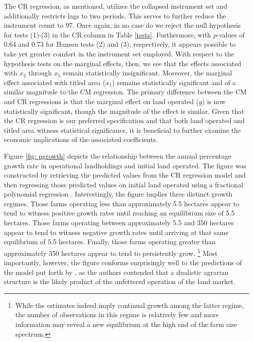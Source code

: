 \documentclass[english]{article}
\begin{document}
The CR regression, as mentioned, utilizes the collapsed instrument set and 
additionally restricts lags to two periods.
This serves to further reduce the instrument count to 97.
Once again, in no case do we reject the null hypothesis for tests (1)-(3) in the 
CR column in Table \ref{tests}. 
Furthermore, with $p$-values of 0.64 and 0.73 for Hansen tests (2) and (3), 
respectively, it appears possible to take yet greater comfort in the instrument 
set employed.
With respect to the hypothesis tests on the marginal effects, then, we see that 
the effects associated with $x_2$ through $x_5$ remain statistically 
insignificant.  
Moreover, the marginal effect associated with titled area ($x_1$) remains 
statistically significant and of a similar magnitude to the CM regression.
The primary difference between the CM and CR regressions is that the 
marginal effect on land operated ($y$) is now statistically significant, 
though the magnitude of the effect is similar.
Given that the CR regression is our preferred specification and that both 
land operated and titled area witness statistical significance, it is beneficial
to further examine the economic implications of the associated 
coefficients.

Figure \ref{fig: pgrowth} depicts the relationship between the annual 
percentage growth rate in operational landholdings and initial land 
operated.
The figure was constructed by retrieving the predicted values from the 
CR regression model and then regressing those predicted values on 
initial land operated using a fractional polynomial regression 
\citep{royston1994}.
Interestingly, the figure implies three distinct growth regimes.
Those farms operating less than approximately 5.5 hectares appear to tend
to witness positive growth rates until reaching an equilibrium size of 5.5 
hectares.
Those farms operating between approximately 5.5 and 350 hectares appear
to tend to witness negative growth rates until arriving at that same 
equilibrium of 5.5 hectares.
Finally, those farms operating greater than approximately 350 hectares 
appear to tend to persistently grow.%
\footnote{While the estimates indeed imply continual growth among the 
latter regime, the number of observations in this regime is relatively few and 
more information may reveal a new equilibrium at the high end of the farm 
size spectrum.}
Most importantly, however, the figure conforms surprisingly well to the 
predictions of the model put forth by \citet{carter1993}, as the authors
contended that a dualistic agrarian structure is the likely product of the 
unfettered operation of the land market.
 
\end{document}
